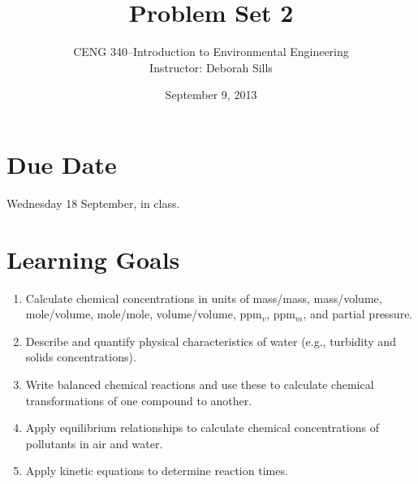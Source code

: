 \documentclass[12pt,letterpaper]{article}
\begin{document}
\setlength{\parindent}{0cm} 


\frenchspacing

\title {Problem Set 2} 
\author {CENG 340--Introduction to Environmental Engineering\\
Instructor: Deborah Sills}
\date {September 9, 2013}
\maketitle

\section *{Due Date}
Wednesday 18 September, in class.

\section *{Learning Goals}
\begin{enumerate}
\item Calculate chemical concentrations in units of mass/mass, mass/volume, mole/volume, mole/mole, volume/volume, ppm$_v$, ppm$_m$, and partial pressure.
\item Describe and quantify physical characteristics of water (e.g., turbidity and solids concentrations).
\item Write balanced chemical reactions and use these to calculate chemical transformations of one compound to another.
\item Apply equilibrium relationships to calculate chemical concentrations of pollutants in air and water.
\item Apply kinetic equations to determine reaction times.
\end{enumerate}
\end{document}
